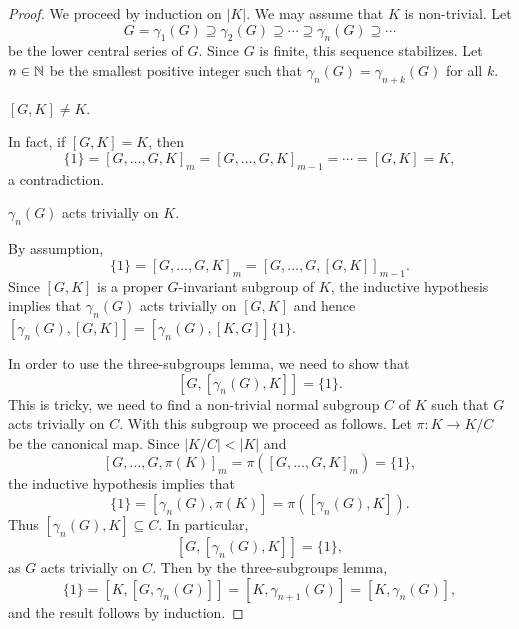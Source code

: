 \begin{proof}
	We proceed by induction on $|K|$. We may assume that $K$ is non-trivial. Let 
	\[
	G=\gamma_1(G)\supseteq \gamma_2(G)\supseteq\cdots\supseteq \gamma_n(G)\supseteq\cdots 
	\]
	be the lower central series of $G$. Since $G$ is finite, this sequence stabilizes. 
	Let $n\in\mathbb{N}$ be the smallest positive integer such that
	$\gamma_n(G)=\gamma_{n+k}(G)$ for all $k$. 
		
	\begin{claim}
		$[G,K]\ne K$. 	
	\end{claim}
	
	In fact, if $[G,K]=K$, then 
	\[
	\{1\}=[G,\dots,G,K]_m=[G,\dots,G,K]_{m-1}=\cdots=[G,K]=K,
	\]
	a contradiction. 
	
	\begin{claim}
		$\gamma_n(G)$ acts trivially on $K$. 
	\end{claim}
	
    By assumption, 
	\[
	\{1\}=[G,\dots,G,K]_m=[G,\dots,G,[G,K]]_{m-1}.
	\]
	Since $[G,K]$ is a proper $G$-invariant subgroup of $K$, 
	the inductive hypothesis implies that $\gamma_n(G)$ acts
	trivially on $[G,K]$ and hence   
	$[\gamma_n(G),[G,K]]=[\gamma_n(G),[K,G]]\{1\}$.  
	
	In order to use the three-subgroups lemma, we need to show that 
	\[
	[G,[\gamma_n(G),K]]=\{1\}.
	\]
	This is tricky, we need to find a non-trivial normal subgroup $C$ of $K$ 
	such that $G$ acts trivially on $C$. With this subgroup we proceed as follows. 
	Let $\pi\colon K\to K/C$ be the canonical map. 
	Since $|K/C|<|K|$ and
	\[
	[G,\dots,G,\pi(K)]_m=\pi([G,\dots,G,K]_m)=\{1\},
	\]
	the inductive hypothesis implies that 
	\[
	\{1\}=[\gamma_n(G),\pi(K)]=\pi([\gamma_n(G),K]).
	\]
	Thus $[\gamma_n(G),K]\subseteq C$. In particular, 
	\[
	[G,[\gamma_n(G),K]]=\{1\},
	\]
	as $G$ acts trivially on $C$. Then by the three-subgroups lemma,
	\[ \{1\}=[K,[G,\gamma_n(G)]]=[K,\gamma_{n+1}(G)]=[K,\gamma_n(G)],\]
	and the result follows by induction.
	

\end{proof}

